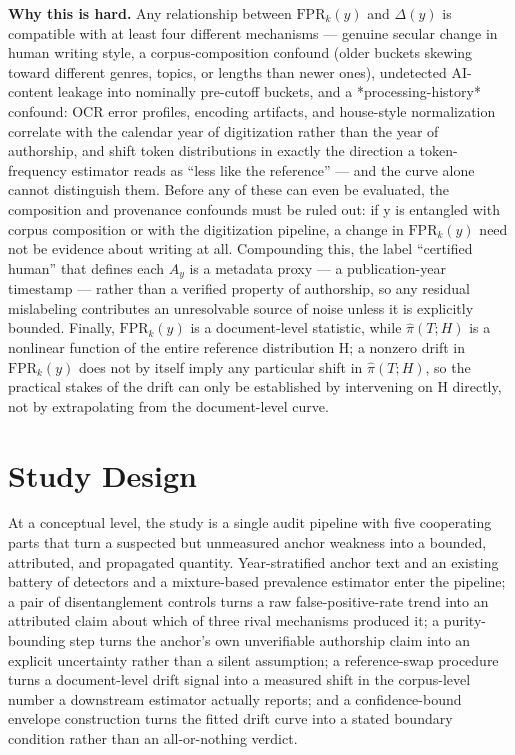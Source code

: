 \documentclass[conference]{IEEEtran}
\begin{document}
\smallskip\noindent\textbf{Why this is hard.} Any relationship between $\mathrm{FPR}_k(y)$ and $\Delta(y)$ is compatible with at least four different mechanisms --- genuine secular change in human writing style, a corpus-composition confound (older buckets skewing toward different genres, topics, or lengths than newer ones), undetected AI-content leakage into nominally pre-cutoff buckets, and a *processing-history* confound: OCR error profiles, encoding artifacts, and house-style normalization correlate with the calendar year of digitization rather than the year of authorship, and shift token distributions in exactly the direction a token-frequency estimator reads as ``less like the reference'' --- and the curve alone cannot distinguish them. Before any of these can even be evaluated, the composition and provenance confounds must be ruled out: if y is entangled with corpus composition or with the digitization pipeline, a change in $\mathrm{FPR}_k(y)$ need not be evidence about writing at all. Compounding this, the label ``certified human'' that defines each $A_y$ is a metadata proxy --- a publication-year timestamp --- rather than a verified property of authorship, so any residual mislabeling contributes an unresolvable source of noise unless it is explicitly bounded. Finally, $\mathrm{FPR}_k(y)$ is a document-level statistic, while $\hat{\pi}(T; H)$ is a nonlinear function of the entire reference distribution H; a nonzero drift in $\mathrm{FPR}_k(y)$ does not by itself imply any particular shift in $\hat{\pi}(T; H)$, so the practical stakes of the drift can only be established by intervening on H directly, not by extrapolating from the document-level curve.

\section{Study Design}\label{sec:design}

At a conceptual level, the study is a single audit pipeline with five cooperating parts that turn a suspected but unmeasured anchor weakness into a bounded, attributed, and propagated quantity. Year-stratified anchor text and an existing battery of detectors and a mixture-based prevalence estimator enter the pipeline; a pair of disentanglement controls turns a raw false-positive-rate trend into an attributed claim about which of three rival mechanisms produced it; a purity-bounding step turns the anchor's own unverifiable authorship claim into an explicit uncertainty rather than a silent assumption; a reference-swap procedure turns a document-level drift signal into a measured shift in the corpus-level number a downstream estimator actually reports; and a confidence-bound envelope construction turns the fitted drift curve into a stated boundary condition rather than an all-or-nothing verdict.
\end{document}
